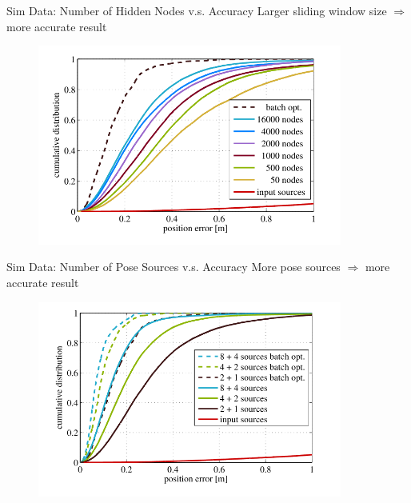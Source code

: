 \documentclass[10pt]{beamer}
\begin{document}
	\begin{frame}{Sim Data: Number of Hidden Nodes v.s. Accuracy}
		Larger sliding window size $\Rightarrow$ more accurate result
		\begin{figure}[!ht]
			\centering
			\includegraphics[width=10cm]{./img/accuracy.png}
		\end{figure}
	\end{frame}

	\begin{frame}{Sim Data: Number of Pose Sources v.s. Accuracy}
		More pose sources $\Rightarrow$ more accurate result
		\begin{figure}[!ht]
			\centering
			\includegraphics[width=10cm]{./img/sources.png}
		\end{figure}
	\end{frame}
\end{document}
